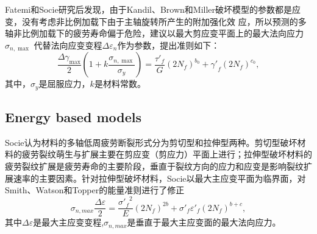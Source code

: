 
Fatemi和Socie\cite{Fatemi1988}研究后发现，由于Kandil、Brown和Miller破坏模型的参数都是应变，没有考虑非比例加载下由于主轴旋转所产生的附加强化效
应，所以预测的多轴非比例加载下的疲劳寿命偏于危险，建议以最大剪应变平面上的最大法向应力${\sigma _{n,\max }}$
代替法向应变变程$\Delta {\varepsilon _n}$作为参数，提出准则如下：
\begin{equation}
\frac{{\Delta {\gamma _{\max }}}}{2}\left( {1 + k\frac{{{\sigma _{n,\max }}}}{{{\sigma _y}}}} \right) = \frac{{{{\tau '}_f}}}{G}{\left( {2{N_f}} \right)^{{b_0}}} + {{\gamma '}_f}{\left( {2{N_f}} \right)^{{c_0}}},
\end{equation}
其中，$\sigma_y$是屈服应力，$k$是材料常数。

\subsection{Energy based models}
Socie\cite{socie1987multiaxial}认为材料的多轴低周疲劳断裂形式分为剪切型和拉伸型两种。剪切型破坏材料的疲劳裂纹萌生与扩展主要在剪应变（剪应力）平面上进行；拉伸型破坏材料的疲劳裂纹扩展是疲劳寿命的主要阶段，垂直于裂纹方向的应力和应变是影响裂纹扩展速率的主要因素。针对拉伸型破坏材料，Socie以最大主应变平面为临界面，对Smith、Watson和Topper\cite{smith1970stress}的能量准则进行了修正
\begin{equation}
{\sigma _{n,max}}\frac{{\Delta \varepsilon }}{2} = \frac{{{{\sigma '}_f}^2}}{E}{\left( {2{N_f}} \right)^{2b}} + {\sigma '_f}{\varepsilon '_f}{\left( {2{N_f}} \right)^{b + c}},
\end{equation}
其中$\Delta \varepsilon$是最大主应变变程,${\sigma _{n,max}}$是垂直于最大主应变面的最大法向应力。

